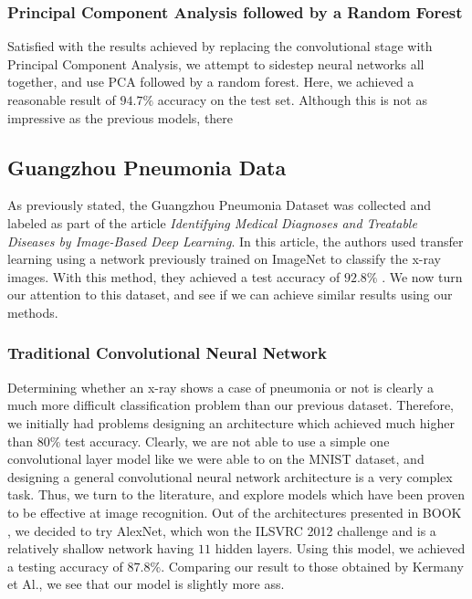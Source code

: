 \documentclass[onecolumn,10pt,cleanfoot]{asme2ej}
\begin{document}
\subsubsection{Principal Component Analysis followed by a Random Forest}

Satisfied with the results achieved by replacing the convolutional stage with Principal Component Analysis, we attempt to sidestep neural networks all together, and use PCA followed by a random forest. Here, we achieved a reasonable result of $94.7\%$ accuracy on the test set. Although this is not as impressive as the previous models, there

\subsection{Guangzhou Pneumonia Data}

As previously stated, the Guangzhou Pneumonia Dataset was collected and labeled as part of the article {\it Identifying Medical Diagnoses and Treatable Diseases by Image-Based Deep Learning}. In this article, the authors used transfer learning using a network previously trained on ImageNet to classify the x-ray images. With this method, they achieved a test accuracy of $92.8\%$ \cite[1127]{xray}. We now turn our attention to this dataset, and see if we can achieve similar results using our methods.

\subsubsection{Traditional Convolutional Neural Network}

Determining whether an x-ray shows a case of pneumonia or not is clearly a much more difficult classification problem than our previous dataset. Therefore, we initially had problems designing an architecture which achieved much higher than $80\%$ test accuracy. Clearly, we are not able to use a simple one convolutional layer model like we were able to on the MNIST dataset, and designing a general convolutional neural network architecture is a very complex task. Thus, we turn to the literature, and explore models which have been proven to be effective at image recognition. Out of the architectures presented in BOOK \cite{geron}, we decided to try AlexNet, which won the ILSVRC 2012 challenge and is a relatively shallow network having $11$ hidden layers. Using this model, we achieved a testing accuracy of $87.8\%$. Comparing our result to those obtained by Kermany et Al., we see that our model is slightly more ass.
\end{document}
